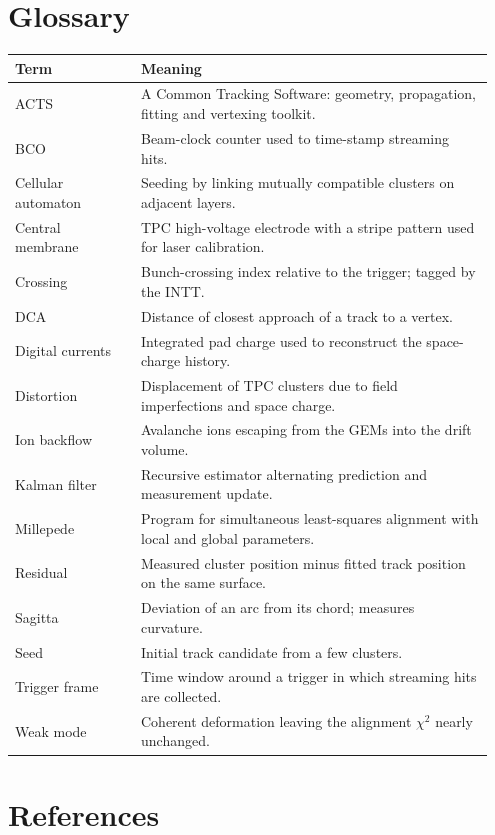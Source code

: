 \documentclass[11pt,letterpaper]{article}
\begin{document}
\section{Glossary}
\begin{longtable}{@{}p{0.25\linewidth}p{0.70\linewidth}@{}}\toprule
Term & Meaning \\\midrule\endhead
ACTS & A Common Tracking Software: geometry, propagation, fitting and vertexing toolkit. \\
BCO & Beam-clock counter used to time-stamp streaming hits. \\
Cellular automaton & Seeding by linking mutually compatible clusters on adjacent layers. \\
Central membrane & TPC high-voltage electrode with a stripe pattern used for laser calibration. \\
Crossing & Bunch-crossing index relative to the trigger; tagged by the INTT. \\
DCA & Distance of closest approach of a track to a vertex. \\
Digital currents & Integrated pad charge used to reconstruct the space-charge history. \\
Distortion & Displacement of TPC clusters due to field imperfections and space charge. \\
Ion backflow & Avalanche ions escaping from the GEMs into the drift volume. \\
Kalman filter & Recursive estimator alternating prediction and measurement update. \\
Millepede & Program for simultaneous least-squares alignment with local and global parameters. \\
Residual & Measured cluster position minus fitted track position on the same surface. \\
Sagitta & Deviation of an arc from its chord; measures curvature. \\
Seed & Initial track candidate from a few clusters. \\
Trigger frame & Time window around a trigger in which streaming hits are collected. \\
Weak mode & Coherent deformation leaving the alignment $\chi^2$ nearly unchanged. \\\bottomrule
\end{longtable}

\section*{References}
\end{document}
